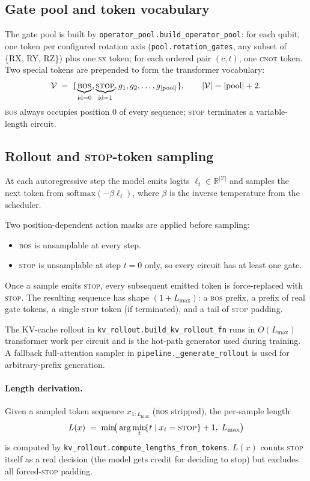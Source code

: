 \documentclass[11pt]{article}
\newcommand{\Lmax}{L_{\max}}
\begin{document}
\subsection{Gate pool and token vocabulary}

The gate pool is built by \texttt{operator\_pool.build\_operator\_pool}:
for each qubit, one token per configured rotation axis
(\texttt{pool.rotation\_gates}, any subset of \{RX, RY, RZ\}) plus one
\textsc{sx} token; for each ordered pair $(c,t)$, one \textsc{cnot} token.
Two special tokens are prepended to form the transformer vocabulary:
\[
\mathcal{V} \;=\; \{\underbrace{\text{\textsc{bos}}}_{\text{id}=0},
                   \underbrace{\text{\textsc{stop}}}_{\text{id}=1},
                   g_1, g_2, \ldots, g_{|\mathrm{pool}|}\},
\qquad |\mathcal{V}| = |\mathrm{pool}| + 2.
\]
\textsc{bos} always occupies position $0$ of every sequence; \textsc{stop}
terminates a variable-length circuit.

\subsection{Rollout and \textsc{stop}-token sampling}
\label{sec:rollout}

At each autoregressive step the model emits logits $\ell_t\in\mathbb{R}^{|
\mathcal{V}|}$ and samples the next token from $\mathrm{softmax}(-\beta\ell_t)$,
where $\beta$ is the inverse temperature from the scheduler.

Two position-dependent action masks are applied before sampling:
\begin{itemize}[leftmargin=1.5em]
  \item \textsc{bos} is unsamplable at every step.
  \item \textsc{stop} is unsamplable at step $t=0$ only, so every circuit has
  at least one gate.
\end{itemize}
Once a sample emits \textsc{stop}, every subsequent emitted token is
force-replaced with \textsc{stop}. The resulting sequence has shape
$(1+\Lmax)$: a \textsc{bos} prefix, a prefix of real gate tokens, a single
\textsc{stop} token (if terminated), and a tail of \textsc{stop} padding.

The KV-cache rollout in \texttt{kv\_rollout.build\_kv\_rollout\_fn} runs in
$O(\Lmax)$ transformer work per circuit and is the hot-path generator used
during training. A fallback full-attention sampler in
\texttt{pipeline.\_generate\_rollout} is used for arbitrary-prefix generation.

\paragraph{Length derivation.} Given a sampled token sequence
$x_{1:\Lmax}$ (\textsc{bos} stripped), the per-sample length
\[
  L(x) \;=\; \min\!\bigl(\,\arg\min_t\!\{t \mid x_t = \textsc{stop}\} + 1,\;
  \Lmax\bigr)
\]
is computed by \texttt{kv\_rollout.compute\_lengths\_from\_tokens}. $L(x)$
counts \textsc{stop} itself as a real decision (the model gets credit for
deciding to stop) but excludes all forced-\textsc{stop} padding.
\end{document}
